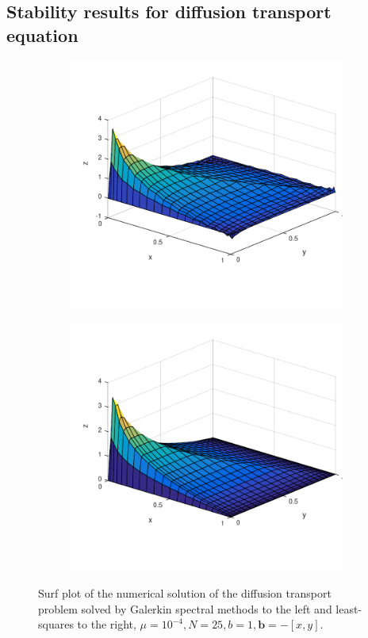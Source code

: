 \newpage
\subsection{Stability results for diffusion transport equation}
%
\begin{figure}[h]
  \centering
  \begin{subfigure}[b]{0.48\textwidth}
	\includegraphics[width=\textwidth]{Figures/Spec_difftrans_aNeg.pdf}
  \end{subfigure}%
  \quad
  \begin{subfigure}[b]{0.48\textwidth}
	\includegraphics[width=\textwidth]{Figures/SpecLS_difftrans_aNeg.pdf}
  \end{subfigure}
  \vspace{-0.1\baselineskip}
	\caption{Surf plot of the numerical solution of the diffusion transport problem solved by Galerkin spectral methods to the left and least-squares to the right, $\mu = 10^{-4},N=25,b = 1, \mathbf{b} = -[x,y]$.}
  \label{fig:SurfDiffTransNeg}
\end{figure}
